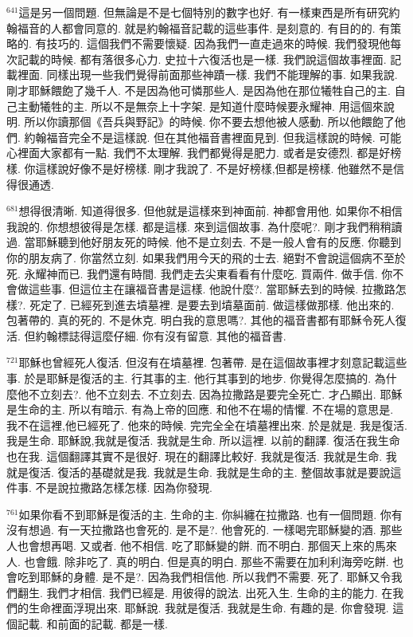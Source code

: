 \documentclass{book}
\begin{document}
$^{641}$這是另一個問題.
但無論是不是七個特別的數字也好.
有一樣東西是所有研究約翰福音的人都會同意的.
就是約翰福音記載的這些事件.
是刻意的.
有目的的.
有策略的.
有技巧的.
這個我們不需要懷疑.
因為我們一直走過來的時候.
我們發現他每次記載的時候.
都有落很多心力.
史拉十六復活也是一樣.
我們說這個故事裡面.
記載裡面.
同樣出現一些我們覺得前面那些神蹟一樣.
我們不能理解的事.
如果我說.
剛才耶穌餵飽了幾千人.
不是因為他可憐那些人.
是因為他在那位犧牲自己的主.
自己主動犧牲的主.
所以不是無奈上十字架.
是知道什麼時候要永耀神.
用這個來說明.
所以你讀那個《吾兵與野記》的時候.
你不要去想他被人感動.
所以他餵飽了他們.
約翰福音完全不是這樣說.
但在其他福音書裡面見到.
但我這樣說的時候.
可能心裡面大家都有一點.
我們不太理解.
我們都覺得是肥力.
或者是安德烈.
都是好榜樣.
你這樣說好像不是好榜樣.
剛才我說了.
不是好榜樣,但都是榜樣.
他雖然不是信得很通透.

$^{681}$想得很清晰.
知道得很多.
但他就是這樣來到神面前.
神都會用他.
如果你不相信我說的.
你想想彼得是怎樣.
都是這樣.
來到這個故事.
為什麼呢?.
剛才我們稍稍讀過.
當耶穌聽到他好朋友死的時候.
他不是立刻去.
不是一般人會有的反應.
你聽到你的朋友病了.
你當然立刻.
如果我們用今天的飛的士去.
絕對不會說這個病不至於死.
永耀神而已.
我們還有時間.
我們走去尖東看看有什麼吃.
買兩件.
做手信.
你不會做這些事.
但這位主在讓福音書是這樣.
他說什麼?.
當耶穌去到的時候.
拉撒路怎樣?.
死定了.
已經死到進去墳墓裡.
是要去到墳墓面前.
做這樣做那樣.
他出來的.
包著帶的.
真的死的.
不是休克.
明白我的意思嗎?.
其他的福音書都有耶穌令死人復活.
但約翰標誌得這麼仔細.
你有沒有留意.
其他的福音書.

$^{721}$耶穌也曾經死人復活.
但沒有在墳墓裡.
包著帶.
是在這個故事裡才刻意記載這些事.
於是耶穌是復活的主.
行其事的主.
他行其事到的地步.
你覺得怎麼搞的.
為什麼他不立刻去?.
他不立刻去.
不立刻去.
因為拉撒路是要完全死亡.
才凸顯出.
耶穌是生命的主.
所以有暗示.
有為上帝的回應.
和他不在場的情懼.
不在場的意思是.
我不在這裡,他已經死了.
他來的時候.
完完全全在墳墓裡出來.
於是就是.
我是復活.
我是生命.
耶穌說,我就是復活.
我就是生命.
所以這裡.
以前的翻譯.
復活在我生命也在我.
這個翻譯其實不是很好.
現在的翻譯比較好.
我就是復活.
我就是生命.
我就是復活.
復活的基礎就是我.
我就是生命.
我就是生命的主.
整個故事就是要說這件事.
不是說拉撒路怎樣怎樣.
因為你發現.

$^{761}$如果你看不到耶穌是復活的主.
生命的主.
你糾纏在拉撒路.
也有一個問題.
你有沒有想過.
有一天拉撒路也會死的.
是不是?.
他會死的.
一樣喝完耶穌變的酒.
那些人也會想再喝.
又或者.
他不相信.
吃了耶穌變的餅.
而不明白.
那個天上來的馬來人.
也會餓.
除非吃了.
真的明白.
但是真的明白.
那些不需要在加利利海旁吃餅.
也會吃到耶穌的身體.
是不是?.
因為我們相信他.
所以我們不需要.
死了.
耶穌又令我們翻生.
我們才相信.
我們已經是.
用彼得的說法.
出死入生.
生命的主的能力.
在我們的生命裡面浮現出來.
耶穌說.
我就是復活.
我就是生命.
有趣的是.
你會發現.
這個記載.
和前面的記載.
都是一樣.
\end{document}
